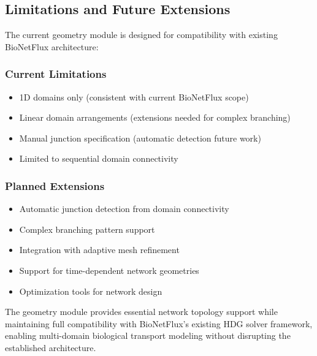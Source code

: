 \subsection{Limitations and Future Extensions}
\label{subsec:limitations}

The current geometry module is designed for compatibility with existing BioNetFlux architecture:

\subsubsection{Current Limitations}

\begin{itemize}
	\item 1D domains only (consistent with current BioNetFlux scope)
	\item Linear domain arrangements (extensions needed for complex branching)
	\item Manual junction specification (automatic detection future work)
	\item Limited to sequential domain connectivity
\end{itemize}

\subsubsection{Planned Extensions}

\begin{itemize}
	\item Automatic junction detection from domain connectivity
	\item Complex branching pattern support
	\item Integration with adaptive mesh refinement
	\item Support for time-dependent network geometries
	\item Optimization tools for network design
\end{itemize}

The geometry module provides essential network topology support while maintaining full compatibility with BioNetFlux's existing HDG solver framework, enabling multi-domain biological transport modeling without disrupting the established architecture.
